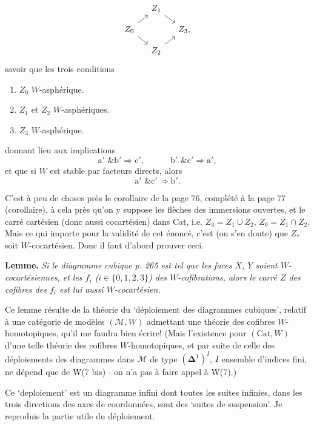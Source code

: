 \documentclass[11pt]{article}
\newcommand{\printedpage}[1]{\marginpar{\footnotesize p.~#1}}
\newcommand{\msp}[1]{\marginpar{\footnotesize [#1]}}
\begin{document}
\printedpage{174}
\[
\begin{tikzcd}[ampersand replacement=\&, row sep=small, column sep=small]
 \& Z_1 \arrow[dr] \& \\
Z_0 \arrow[ur] \arrow[dr] \& \& Z_3, \\
 \& Z_2 \arrow[ur] \&
\end{tikzcd}
\]
savoir que les trois conditions
\begin{enumerate}[label={}]
\item[a$'$)] $Z_0$ $W$-asphérique.
\item[b$'$)] $Z_1$ et $Z_2$ $W$-asphériques.
\item[c$'$)] $Z_3$ $W$-asphérique.
\end{enumerate}
donnant lieu aux implications
\[
\mathrm{a}' \text{ \& } \mathrm{b}' \Longrightarrow \mathrm{c}', \qquad\quad \mathrm{b}' \text{ \& } \mathrm{c}' \Longrightarrow \mathrm{a}',
\]
et que si $W$ est stable par facteurs directs, alors
\[
\mathrm{a}' \text{ \& } \mathrm{c}' \Longrightarrow \mathrm{b}'.
\]

C'est à peu de choses près le corollaire de la page 76, complété à la page 77 (corollaire), à cela près qu'on y suppose les flèches des immersions ouvertes, et le carré cartésien (donc aussi cocartésien) dans Cat, i.e. $Z_3 = Z_1 \cup Z_2$, $Z_0 = Z_1 \cap Z_2$. Mais
\msp{page 268}
ce qui importe pour la validité de cet énoncé, c'est (on s'en doute) que $Z_*$ soit $W$-cocartésien. Donc il faut d'abord prouver ceci.

\textbf{Lemme.} \textit{Si le diagramme cubique p. 265 est tel que les faces $X$, $Y$ soient $W$-cocartésiennes, et les $f_i$ ($i \in \{0,1,2,3\}$) des $W$-cofibrations, alors le carré $Z$ des cofibres des $f_i$ est lui aussi $W$-cocartésien.}

Ce lemme résulte de la théorie du `déploiement des diagrammes cubiques', relatif à une catégorie de modèles $(\mathcal{M}, W)$ admettant une théorie des cofibres $W$-homotopiques, qu'il me faudra bien écrire! (Mais l'existence pour $(\mathrm{Cat}, W)$ d'une telle théorie des cofibres $W$-homotopiques, et par suite de celle des déploiements des diagrammes dans $\mathcal{M}$ de type $(\boldsymbol{\Delta}^1)^I$, $I$ ensemble d'indices fini, ne dépend que de W(7 bis) - on n'a pas à faire appel à W(7).)

\msp{page 269}
Ce `deploiement' est un diagramme infini dont toutes les suites infinies, dans les trois directions des axes de coordonnées, sont des `suites de suspension'. Je reproduis la partie utile du déploiement. %
\end{document}
